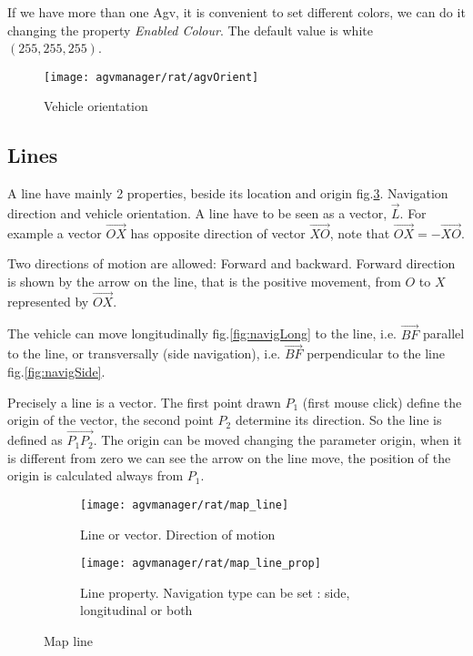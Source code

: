 If we have more than one Agv, it is convenient to set different colors, we can do it changing the property \textit{Enabled Colour}. The default value is white $(255,255,255)$.

\begin{figure}
	\centering
	\texttt{[image: agvmanager/rat/agvOrient]}
	\caption{Vehicle orientation}
	\label{fig:agvOrient}
\end{figure}

\subsection{Lines}
A line have mainly 2 properties, beside its location and origin fig.\ref{fig:lineProp}. Navigation direction and vehicle orientation. A line have to be seen as a vector, $\overrightarrow{L}$. For example a vector $\overrightarrow{OX}$ has opposite direction of vector $\overrightarrow{XO}$, note that $\overrightarrow{OX}=-\overrightarrow{XO}$.

Two directions of motion are allowed: Forward and backward. Forward direction is shown by the arrow on the line, that is the positive movement, from $O$ to $X$ represented by $\overrightarrow{OX}$.

The vehicle can move longitudinally fig.\ref{fig:navigLong} to the line, i.e. $\overrightarrow{BF}$ parallel to the line, or transversally (side navigation), i.e. $\overrightarrow{BF}$ perpendicular to the line fig.\ref{fig:navigSide}.

Precisely a line is a vector. The first point drawn $P_{1}$ (first mouse click) define the origin of the vector, the second point $P_{2}$ determine its direction. So the line is defined as $\overrightarrow{P_{1}P_{2}}$. The origin can be moved changing the parameter origin, when it is different from zero we can see the arrow on the line move, the position of the origin is calculated always from $P_{1}$.

\begin{figure}
	\centering
	\begin{subfigure}[b]{0.3\textwidth}
		\texttt{[image: agvmanager/rat/map\_line]}
	\caption{Line or vector. Direction of motion}
	\label{fig:mapLine}
	\end{subfigure}
	\quad
	\begin{subfigure}[b]{0.3\textwidth}
		\texttt{[image: agvmanager/rat/map\_line\_prop]}
	\caption{Line property. Navigation type can be set : side, longitudinal or both}
	\label{fig:lineProp}
	\end{subfigure}
	\caption{Map line}\label{fig:animals}
\end{figure}


